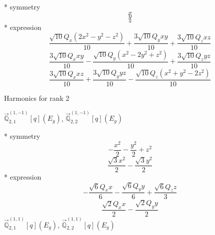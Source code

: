 \documentclass[fleqn,8pt]{jsarticle}
\begin{document}
\noindent\quad ** symmetry
\begin{dmath*}
x
\end{dmath*}
\begin{dmath*}
y
\end{dmath*}
\begin{dmath*}
z
\end{dmath*}
\noindent\quad ** expression
\begin{dmath*}
\frac{\sqrt{10} Q_{x} \left(2 x^{2} - y^{2} - z^{2}\right)}{10} + \frac{3 \sqrt{10} Q_{y} x y}{10} + \frac{3 \sqrt{10} Q_{z} x z}{10}
\end{dmath*}
\begin{dmath*}
\frac{3 \sqrt{10} Q_{x} x y}{10} - \frac{\sqrt{10} Q_{y} \left(x^{2} - 2 y^{2} + z^{2}\right)}{10} + \frac{3 \sqrt{10} Q_{z} y z}{10}
\end{dmath*}
\begin{dmath*}
\frac{3 \sqrt{10} Q_{x} x z}{10} + \frac{3 \sqrt{10} Q_{y} y z}{10} - \frac{\sqrt{10} Q_{z} \left(x^{2} + y^{2} - 2 z^{2}\right)}{10}
\end{dmath*}

\noindent * Harmonics for rank 2

\noindent\quad $\vec{\mathbb{Q}}_{2,1}^{(1,-1)}[q](E_{g})$, $\vec{\mathbb{Q}}_{2,2}^{(1,-1)}[q](E_{g})$

\noindent\quad ** symmetry
\begin{dmath*}
- \frac{x^{2}}{2} - \frac{y^{2}}{2} + z^{2}
\end{dmath*}
\begin{dmath*}
\frac{\sqrt{3} x^{2}}{2} - \frac{\sqrt{3} y^{2}}{2}
\end{dmath*}
\noindent\quad ** expression
\begin{dmath*}
- \frac{\sqrt{6} Q_{x} x}{6} - \frac{\sqrt{6} Q_{y} y}{6} + \frac{\sqrt{6} Q_{z} z}{3}
\end{dmath*}
\begin{dmath*}
\frac{\sqrt{2} Q_{x} x}{2} - \frac{\sqrt{2} Q_{y} y}{2}
\end{dmath*}
\noindent\quad $\vec{\mathbb{Q}}_{2,1}^{(1,1)}[q](E_{g})$, $\vec{\mathbb{Q}}_{2,2}^{(1,1)}[q](E_{g})$
\end{document}
